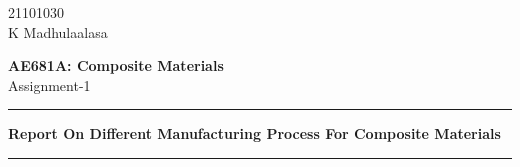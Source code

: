 \documentclass{article}
\begin{document}
\chead{}
\lhead{}
\rhead{}

\begin{flushright}
21101030\\
K Madhulaalasa
\end{flushright}

\begin{center}

\textbf{AE681A: Composite Materials}\\

\vspace{3mm}
{\large Assignment-1}\\

\vspace{4mm}
\hrule

\vspace{4mm}
\textbf{\LARGE Report On Different Manufacturing Process For Composite Materials}\\

\vspace{4mm}
\hrule
\end{center}
\end{document}
